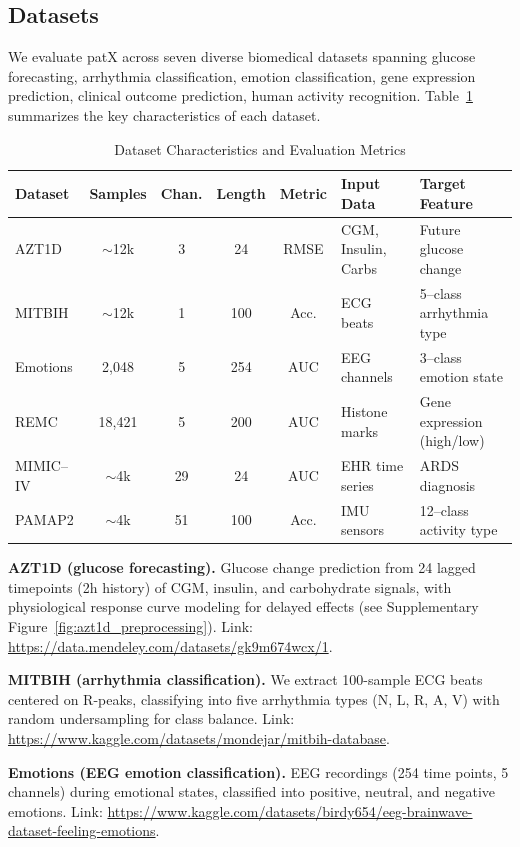 \documentclass[11pt]{article}
\begin{document}
\subsection{Datasets}
We evaluate patX across seven diverse biomedical datasets spanning glucose
forecasting, arrhythmia classification, emotion classification, gene expression
prediction, clinical outcome prediction, human activity recognition.
Table~\ref{tab:datasets} summarizes the key characteristics of each dataset.

\begin{table}[H]
\centering
\caption{Dataset Characteristics and Evaluation Metrics}
\label{tab:datasets}
\footnotesize
\begin{tabular*}{\textwidth}{@{\extracolsep{\fill}}lccccll@{}}
\toprule
\textbf{Dataset} & \textbf{Samples} & \textbf{Chan.} & \textbf{Length} &
\textbf{Metric} & \textbf{Input Data} & \textbf{Target Feature} \\
\midrule
AZT1D & $\sim$12k & 3 & 24 & RMSE & CGM, Insulin, Carbs & Future glucose
change \\
MITBIH & $\sim$12k & 1 & 100 & Acc. & ECG beats & 5--class arrhythmia type \\
Emotions & 2,048 & 5 & 254 & AUC & EEG channels & 3--class emotion state \\
REMC & 18,421 & 5 & 200 & AUC & Histone marks & Gene expression
(high/low) \\
MIMIC--IV & $\sim$4k & 29 & 24 & AUC & EHR time series & ARDS diagnosis \\
PAMAP2 & $\sim$4k & 51 & 100 & Acc. & IMU sensors & 12--class activity type \\
\bottomrule
\end{tabular*}
\end{table}

\textbf{AZT1D (glucose forecasting).}
Glucose change prediction from 24 lagged timepoints (2h history) of CGM, insulin,
and carbohydrate signals, with physiological response curve modeling for delayed
effects (see Supplementary Figure~\ref{fig:azt1d_preprocessing}).
Link: \url{https://data.mendeley.com/datasets/gk9m674wcx/1}.

\textbf{MITBIH (arrhythmia classification).}
We extract 100-sample ECG beats centered on R-peaks, classifying into five
arrhythmia types (N, L, R, A, V) with random undersampling for class balance.
Link: \url{https://www.kaggle.com/datasets/mondejar/mitbih-database}.

\textbf{Emotions (EEG emotion classification).}
EEG recordings (254 time points, 5 channels) during emotional states,
classified into positive, neutral, and negative emotions.
Link: \url{https://www.kaggle.com/datasets/birdy654/eeg-brainwave-dataset-feeling-emotions}.
\end{document}
